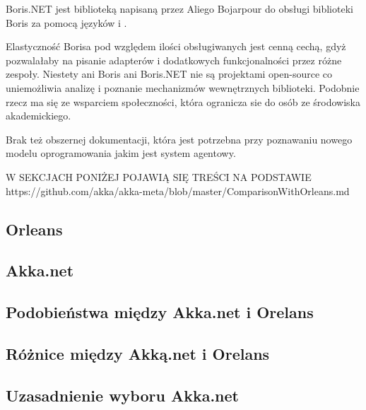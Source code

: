 Boris.NET jest biblioteką napisaną przez Aliego Bojarpour do obsługi biblioteki Boris za pomocą języków \csh i \fsh. 

Elastyczność Borisa pod względem ilości obsługiwanych jest cenną cechą, gdyż pozwalałaby na pisanie adapterów i dodatkowych funkcjonalności przez różne zespoły. 
Niestety ani Boris ani Boris.NET nie są projektami open-source co uniemożliwia analizę i poznanie mechanizmów wewnętrznych biblioteki. Podobnie rzecz ma się ze wsparciem społeczności, która ogranicza sie do osób ze środowiska akademickiego.

Brak też obszernej dokumentacji, która jest potrzebna przy poznawaniu nowego modelu oprogramowania jakim jest system agentowy.

W SEKCJACH PONIŻEJ POJAWIĄ SIĘ TREŚCI NA PODSTAWIE
https://github.com/akka/akka-meta/blob/master/ComparisonWithOrleans.md
\subsection{Orleans}


\subsection{Akka.net}


\subsection{Podobieństwa między Akka.net i Orelans}


\subsection{Różnice między Akką.net i Orelans}


\subsection{Uzasadnienie wyboru Akka.net}